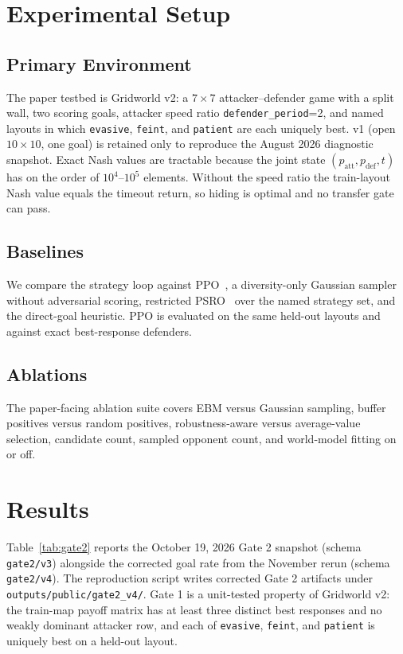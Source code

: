 \documentclass[11pt]{article}
\begin{document}
\section{Experimental Setup}

\subsection{Primary Environment}

The paper testbed is Gridworld v2: a $7\times 7$ attacker--defender game with a split wall, two scoring goals, attacker speed ratio \texttt{defender\_period}=2, and named layouts in which \texttt{evasive}, \texttt{feint}, and \texttt{patient} are each uniquely best.
v1 (open $10\times 10$, one goal) is retained only to reproduce the August 2026 diagnostic snapshot.
Exact Nash values are tractable because the joint state $(p_{\mathrm{att}},p_{\mathrm{def}},t)$ has on the order of $10^4$--$10^5$ elements.
Without the speed ratio the train-layout Nash value equals the timeout return, so hiding is optimal and no transfer gate can pass.

\subsection{Baselines}

We compare the strategy loop against PPO~\cite{schulman2017ppo}, a diversity-only Gaussian sampler without adversarial scoring, restricted PSRO~\cite{lanctot2017psro} over the named strategy set, and the direct-goal heuristic.
PPO is evaluated on the same held-out layouts and against exact best-response defenders.

\subsection{Ablations}

The paper-facing ablation suite covers EBM versus Gaussian sampling, buffer positives versus random positives, robustness-aware versus average-value selection, candidate count, sampled opponent count, and world-model fitting on or off.

\section{Results}

Table~\ref{tab:gate2} reports the October 19, 2026 Gate 2 snapshot (schema \texttt{gate2/v3}) alongside the corrected goal rate from the November rerun (schema \texttt{gate2/v4}). The reproduction script writes corrected Gate 2 artifacts under \texttt{outputs/public/gate2\_v4/}.
Gate 1 is a unit-tested property of Gridworld v2: the train-map payoff matrix has at least three distinct best responses and no weakly dominant attacker row, and each of \texttt{evasive}, \texttt{feint}, and \texttt{patient} is uniquely best on a held-out layout.
\end{document}
